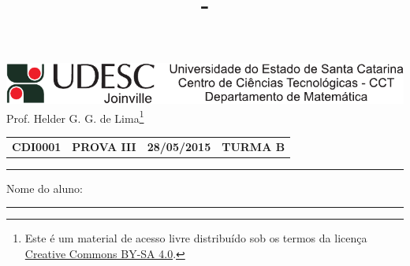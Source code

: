 \documentclass[12pt,a4paper]{article}
\author{\eu}
\title{\tipo - \disciplina}
\date{\data}
\newcommand*\tipo{PROVA III}
\newcommand*\turma{TURMA B}
\newcommand*\disciplina{CDI0001}
\newcommand*\eu{Helder G. G. de Lima}
\newcommand*\data{28/05/2015}
\begin{document}
\thispagestyle{empty}
\begin{center}
\includegraphics{udesc_joinville_cabecalho.pdf}
\\ Prof. \eu\footnote{
Este é um material de acesso livre distribuído sob os termos da licença \href{https://creativecommons.org/licenses/by-sa/4.0/deed.pt_BR}{Creative Commons BY-SA 4.0}.}

\noindent\begin{tabular}{l c c r}
  \textbf{\disciplina}
& \textbf{\tipo}
& \textbf{\data}
& \textbf{\turma}
\end{tabular}\vspace{-0.3cm}
\noindent\rule{17cm}{0.01cm}
\end{center}

\noindent Nome do aluno: \rule{14cm}{0.01cm}
\end{document}
